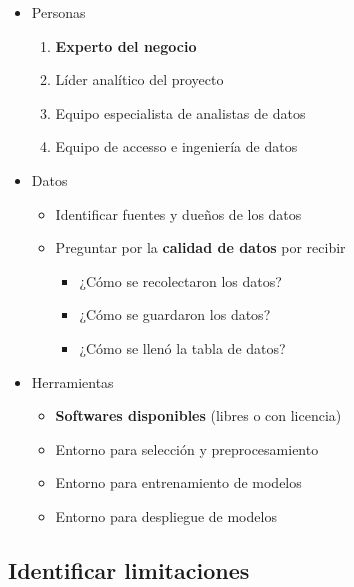 \documentclass[
]{book}
\providecommand{\tightlist}{%
  \setlength{\itemsep}{0pt}\setlength{\parskip}{0pt}}
\begin{document}
\begin{itemize}
\tightlist
\item
  Personas

  \begin{enumerate}
  \def\labelenumi{\arabic{enumi}.}
  \tightlist
  \item
    \textbf{Experto del negocio}
  \item
    Líder analítico del proyecto
  \item
    Equipo especialista de analistas de datos
  \item
    Equipo de accesso e ingeniería de datos
  \end{enumerate}
\item
  Datos

  \begin{itemize}
  \tightlist
  \item
    Identificar fuentes y dueños de los datos
  \item
    Preguntar por la \textbf{calidad de datos} por recibir

    \begin{itemize}
    \tightlist
    \item
      ¿Cómo se recolectaron los datos?
    \item
      ¿Cómo se guardaron los datos?
    \item
      ¿Cómo se llenó la tabla de datos?
    \end{itemize}
  \end{itemize}
\item
  Herramientas

  \begin{itemize}
  \tightlist
  \item
    \textbf{Softwares disponibles} (libres o con licencia)
  \item
    Entorno para selección y preprocesamiento
  \item
    Entorno para entrenamiento de modelos
  \item
    Entorno para despliegue de modelos
  \end{itemize}
\end{itemize}

\hypertarget{identificar-limitaciones}{%
\subsection{Identificar limitaciones}\label{identificar-limitaciones}}
\end{document}
